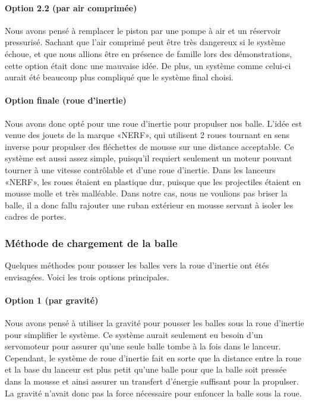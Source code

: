 \paragraph{Option 2.2 (par air comprimée)}
Nous avons pensé à remplacer le piston par une pompe à air et un réservoir pressurisé.
Sachant que l’air comprimé peut être très dangereux si le système échoue, et que nous allions être en présence de famille lors des démonstrations, cette option était donc une mauvaise idée.
De plus, un système comme celui-ci aurait été beaucoup plus compliqué que le système final choisi.

\paragraph{Option finale (roue d’inertie)}
Nous avons donc opté pour une roue d’inertie pour propulser nos balle.
L’idée est venue des jouets de la marque «NERF», qui utilisent 2 roues tournant en sens inverse pour propulser des fléchettes de mousse sur une distance acceptable.
Ce système est aussi assez simple, puisqu’il requiert seulement un moteur pouvant tourner à une vitesse contrôlable et d’une roue d’inertie.
Dans les lanceurs «NERF», les roues étaient en plastique dur, puisque que les projectiles étaient en mousse molle et très malléable.
Dans notre cas, nous ne voulions pas briser la balle, il a donc fallu rajouter une ruban extérieur en mousse servant à isoler les cadres de portes.


\subsubsection{Méthode de chargement de la balle}
Quelques méthodes pour pousser les balles vers la roue d’inertie ont étés envisagées.
Voici les trois options principales.

\paragraph{Option 1 (par gravité)}
Nous avons pensé à utiliser la gravité pour pousser les balles sous la roue d’inertie pour simplifier le système.
Ce système aurait seulement eu besoin d’un servomoteur pour assurer qu’une seule balle tombe à la fois dans le lanceur.
Cependant, le système de roue d’inertie fait en sorte que la distance entre la roue et la base du lanceur est plus petit qu’une balle pour que la balle soit pressée dans la mousse et ainsi assurer un transfert d’énergie suffisant pour la propulser.
La gravité n’avait donc pas la force nécessaire pour enfoncer la balle sous la roue.

